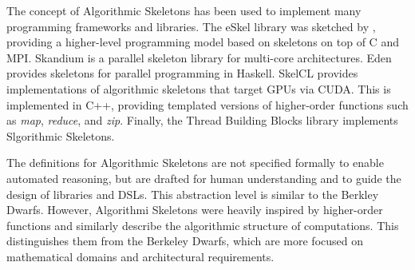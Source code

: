     The concept of Algorithmic Skeletons has been used to implement many
    programming frameworks and libraries.
    The eSkel library was sketched by \citet{Cole2004Bringing}, providing a
    higher-level programming model based on skeletons on top of C and MPI.
    Skandium \citep{Leyton2010Skandium} is a parallel skeleton library for
    multi-core architectures.
    Eden \citep{Loogen2005Parallel} provides skeletons for parallel programming
    in Haskell.
    SkelCL \citep{Steuwer2011SkelCL} provides implementations of algorithmic
    skeletons that target GPUs via CUDA.
    This is implemented in C++, providing templated versions of higher-order
    functions such as {\it map}, {\it reduce}, and {\it zip}.
    Finally, the Thread Building Blocks library
    \citep{Reinders2007Intel} implements Slgorithmic Skeletons.

    The definitions for Algorithmic Skeletons are not specified formally to
    enable automated reasoning, but are drafted for human understanding and to
    guide the design of libraries and DSLs.
    This abstraction level is similar to the Berkley Dwarfs.
    However, Algorithmi Skeletons were heavily inspired by higher-order
    functions and similarly describe the algorithmic structure of computations.
    This distinguishes them from the Berkeley Dwarfs, which are more focused on
    mathematical domains and architectural requirements.
